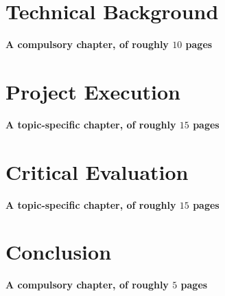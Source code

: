 \documentclass[ %
                    author={Alexander Dalton},
                supervisor={Prof. Seth Bullock},
                    degree={MEng},
                     title={Exploring Evolutionary Hardware and its Application to Dynamic Problems},
                  subtitle={},
                      type={research},
                      year={2018} ]{dissertation}
\begin{document}



\chapter{Technical Background}
\label{chap:technical}

{\bf \color{red}A compulsory chapter,     of roughly $10$ pages} 
\vspace{1cm} 




\chapter{Project Execution}
\label{chap:execution}

{\bf \color{red}A topic-specific chapter, of roughly $15$ pages} 
\vspace{1cm} 






\chapter{Critical Evaluation}
\label{chap:evaluation}

{\bf \color{red}A topic-specific chapter, of roughly $15$ pages} 
\vspace{1cm} 





\chapter{Conclusion}
\label{chap:conclusion}

{\bf \color{red}A compulsory chapter,     of roughly $5$ pages} 
\vspace{1cm} 



%
%
\end{document}

